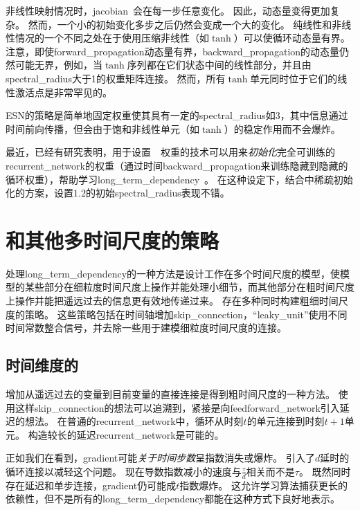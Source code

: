 非线性映射情况时，\gls{jacobian}~会在每一步任意变化。
因此，动态量变得更加复杂。
然而，一个小的初始变化多步之后仍然会变成一个大的变化。
纯线性和非线性情况的一个不同之处在于使用压缩非线性（如$\tanh$）可以使循环动态量有界。
注意，即使\gls{forward_propagation}动态量有界，\gls{backward_propagation}的动态量仍然可能无界，例如，当$\tanh$序列都在它们状态中间的线性部分，并且由\gls{spectral_radius}大于1的权重矩阵连接。
然而，所有$\tanh$单元同时位于它们的线性激活点是非常罕见的。


\gls{ESN}的策略是简单地固定权重使其具有一定的\gls{spectral_radius}如3，其中信息通过时间前向传播，但会由于饱和非线性单元（如$\tanh$）的稳定作用而不会爆炸。

最近，已经有研究表明，用于设置~~权重的技术可以用来\emph{初始化}完全可训练的\gls{recurrent_network}的权重（通过时间\gls{backward_propagation}来训练隐藏到隐藏的循环权重），帮助学习\gls{long_term_dependency}~\citep{Sutskever-thesis2012,sutskeverimportance}。
在这种设定下，结合中稀疏初始化的方案，设置$1.2$的初始\gls{spectral_radius}表现不错。

\section{和其他多时间尺度的策略}
\label{sec:leaky_units_and_other_strategiesfor_multiple_time_scales}
处理\gls{long_term_dependency}的一种方法是设计工作在多个时间尺度的模型，使模型的某些部分在细粒度时间尺度上操作并能处理小细节，而其他部分在粗时间尺度上操作并能把遥远过去的信息更有效地传递过来。
存在多种同时构建粗细时间尺度的策略。
这些策略包括在时间轴增加\gls{skip_connection}，``\gls{leaky_unit}''使用不同时间常数整合信号，并去除一些用于建模细粒度时间尺度的连接。

\subsection{时间维度的}
\label{sec:adding_skip_connections_through_time}
增加从遥远过去的变量到目前变量的直接连接是得到粗时间尺度的一种方法。
使用这样\gls{skip_connection}的想法可以追溯到\cite{Lin-ieeetnn96}，紧接是向\gls{feedforward_network}引入延迟的想法\citep{Lang+Hinton88}。
在普通的\gls{recurrent_network}中，循环从时刻$t$的单元连接到时刻$t+1$单元。
构造较长的延迟\gls{recurrent_network}是可能的\citep{Bengio91}。

正如我们在看到，\gls{gradient}可能\emph{关于时间步数}呈指数消失或爆炸。
\citep{Lin-ieeetnn96}引入了$d$延时的循环连接以减轻这个问题。
现在导数指数减小的速度与$\frac{\tau}{d}$相关而不是$\tau$。
既然同时存在延迟和单步连接，\gls{gradient}仍可能成$t$指数爆炸。
这允许学习算法捕获更长的依赖性，但不是所有的\gls{long_term_dependency}都能在这种方式下良好地表示。


